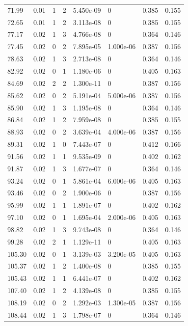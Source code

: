 \documentclass[preview]{standalone}
\begin{document}
{{{\begin{tabular}{L{1.2cm}C{1.2cm} C{0.3cm}C{0.5cm} C{1.4cm}C{1.4cm} C{1.4cm}C{1.4cm}}
  71.99  &  0.01  & 1     &  2 &  5.450e-09  & 0  & 0.385 &  0.155   \\ 
  72.65  &  0.01  & 1     &  2 &  3.113e-08  & 0  & 0.385 &  0.155   \\ 
  77.17  &  0.02  & 1     &  3 &  4.766e-08  & 0  & 0.364 &  0.146   \\ 
  77.45  &  0.02  & 0     &  2 &  7.895e-05  & 1.000e-06  & 0.387 &  0.156   \\ 
  78.63  &  0.02  & 1     &  3 &  2.713e-08  & 0  & 0.364 &  0.146   \\ 
  82.92  &  0.02  & 0     &  1 &  1.180e-06  & 0  & 0.405 &  0.163   \\ 
  84.69  &  0.02  & 2     &  2 &  1.300e-11  & 0  & 0.387 &  0.156   \\ 
  85.62  &  0.02  & 0     &  2 &  5.191e-04  & 5.000e-06  & 0.387 &  0.156   \\ 
  85.90  &  0.02  & 1     &  3 &  1.195e-08  & 0  & 0.364 &  0.146   \\ 
  86.84  &  0.02  & 1     &  2 &  7.959e-08  & 0  & 0.385 &  0.155   \\ 
  88.93  &  0.02  & 0     &  2 &  3.639e-04  & 4.000e-06  & 0.387 &  0.156   \\ 
  89.31  &  0.02  & 1     &  0 &  7.443e-07  & 0  & 0.412 &  0.166   \\ 
  91.56  &  0.02  & 1     &  1 &  9.535e-09  & 0  & 0.402 &  0.162   \\ 
  91.87  &  0.02  & 1     &  3 &  1.677e-07  & 0  & 0.364 &  0.146   \\ 
  93.24  &  0.02  & 0     &  1 &  5.861e-04  & 6.000e-06  & 0.405 &  0.163   \\ 
  93.46  &  0.02  & 0     &  2 &  1.900e-06  & 0  & 0.387 &  0.156   \\ 
  95.99  &  0.02  & 1     &  1 &  1.891e-07  & 0  & 0.402 &  0.162   \\ 
  97.10  &  0.02  & 0     &  1 &  1.695e-04  & 2.000e-06  & 0.405 &  0.163   \\ 
  98.82  &  0.02  & 1     &  3 &  9.743e-08  & 0  & 0.364 &  0.146   \\ 
  99.28  &  0.02  & 2     &  1 &  1.129e-11  & 0  & 0.405 &  0.163   \\ 
  105.30  &  0.02  & 0     &  1 &  3.139e-03  & 3.200e-05  & 0.405 &  0.163   \\ 
  105.37  &  0.02  & 1     &  2 &  1.400e-08  & 0  & 0.385 &  0.155   \\ 
  105.43  &  0.02  & 1     &  1 &  6.441e-07  & 0  & 0.402 &  0.162   \\ 
  107.40  &  0.02  & 1     &  2 &  4.139e-08  & 0  & 0.385 &  0.155   \\ 
  108.19  &  0.02  & 0     &  2 &  1.292e-03  & 1.300e-05  & 0.387 &  0.156   \\ 
  108.44  &  0.02  & 1     &  3 &  1.798e-07  & 0  & 0.364 &  0.146   \\ 
\hline 
\end{tabular} 

}}}
\end{document}
